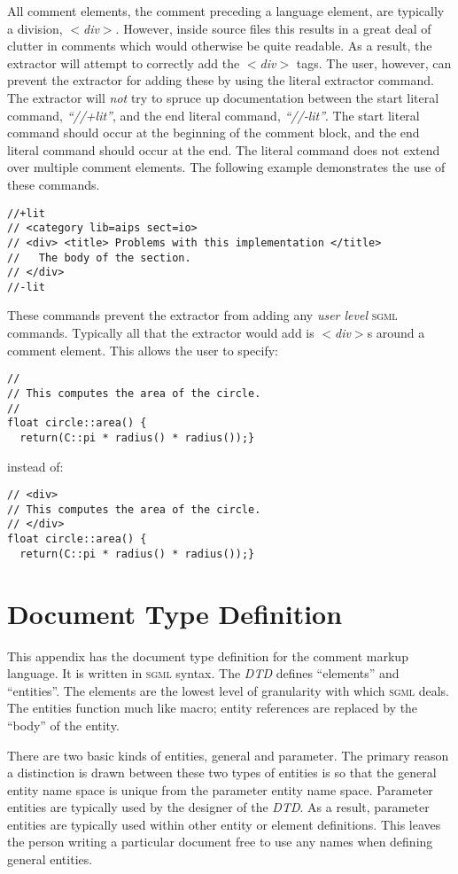 All comment elements, the comment preceding a language element, are 
typically a division, \textit{$<$div$>$}. However, inside source files this
results in a great deal of clutter in comments which would otherwise
be quite readable. As a result, the extractor will attempt to correctly
add the \textit{$<$div$>$} tags. The user, however, can prevent the extractor
for adding these by using the literal extractor command. The extractor
will \emph{not} try to spruce up documentation between the start literal
command, \emph{``//+lit''}, and the end literal command, \emph{``//-lit''}. 
The start literal command should occur at the beginning of the comment block,
and the end literal command should occur at the end. The literal command
does not extend over multiple comment elements. The following example 
demonstrates the use of these commands.
\begin{verbatim}
//+lit
// <category lib=aips sect=io>
// <div> <title> Problems with this implementation </title>
//   The body of the section.
// </div>
//-lit
\end{verbatim}
\noindent
These commands prevent the extractor from adding any \emph{user level} 
\textsc{sgml} commands. Typically all that the extractor would add is 
\textit{$<$div$>$}s around a comment element. This allows the user to specify:
\begin{verbatim}
//
// This computes the area of the circle.
//
float circle::area() {
  return(C::pi * radius() * radius());}
\end{verbatim}
\noindent
instead of:
\begin{verbatim}
// <div>
// This computes the area of the circle.
// </div>
float circle::area() {
  return(C::pi * radius() * radius());}
\end{verbatim}

\appendix
\section{Document Type Definition}

This appendix has the document type definition for the comment markup
language. It is written in \textsc{sgml} syntax. The \emph{DTD} defines
``elements'' and ``entities''. The elements are the lowest level of
granularity with which \textsc{sgml} deals. The entities function much
like macro; entity references are replaced by the ``body'' of the entity.

There are two basic kinds of entities, general and parameter. The primary
reason a distinction is drawn between these two types of entities is so 
that the general entity name space is unique from the parameter entity 
name space. Parameter entities are typically used by the designer of the 
\emph{DTD}. As a result, parameter entities are typically used within 
other entity or element definitions. This leaves the person writing a 
particular document free to use any names when defining general entities.

